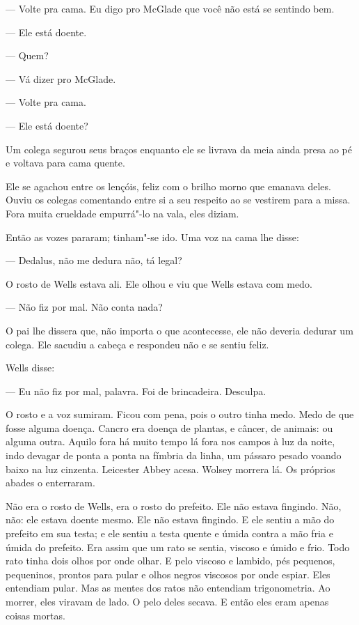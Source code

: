  --- Volte pra cama. Eu digo pro McGlade que você não está se sentindo bem.

 --- Ele está doente.

 --- Quem?

 --- Vá dizer pro McGlade.

 --- Volte pra cama.

 --- Ele está doente?

Um colega segurou seus braços enquanto ele se livrava da meia ainda
presa ao pé e voltava para cama quente.

Ele se agachou entre os lençóis, feliz com o brilho morno que emanava
deles. Ouviu os colegas comentando entre si a seu respeito ao se
vestirem para a missa. Fora muita crueldade empurrá"-lo na vala, eles
diziam.

Então as vozes pararam; tinham"-se ido. Uma voz na cama lhe disse:

 --- Dedalus, não me dedura não, tá legal?

O rosto de Wells estava ali. Ele olhou e viu que Wells estava com medo.

 --- Não fiz por mal. Não conta nada?

O pai lhe dissera que, não importa o que acontecesse, ele não deveria
dedurar um colega. Ele sacudiu a cabeça e respondeu não e se sentiu
feliz.

Wells disse:

 --- Eu não fiz por mal, palavra. Foi de brincadeira. Desculpa.

O rosto e a voz sumiram. Ficou com pena, pois o outro tinha medo. Medo
de que fosse alguma doença. Cancro era doença de plantas, e câncer, de
animais: ou alguma outra. Aquilo fora há muito tempo lá fora nos campos
à luz da noite, indo devagar de ponta a ponta na fímbria da linha, um
pássaro pesado voando baixo na luz cinzenta. Leicester Abbey acesa.
Wolsey morrera lá. Os próprios abades o enterraram.

Não era o rosto de Wells, era o rosto do prefeito. Ele não estava
fingindo. Não, não: ele estava doente mesmo. Ele não estava fingindo. E
ele sentiu a mão do prefeito em sua testa; e ele sentiu a testa quente
e úmida contra a mão fria e úmida do prefeito. Era assim que um rato se
sentia, viscoso e úmido e frio. Todo rato tinha dois olhos por onde
olhar. E pelo viscoso e lambido, pés pequenos, pequeninos, prontos para
pular e olhos negros viscosos por onde espiar. Eles entendiam pular.
Mas as mentes dos ratos não entendiam trigonometria. Ao morrer, eles
viravam de lado. O pelo deles secava. E então eles eram apenas coisas
mortas.

